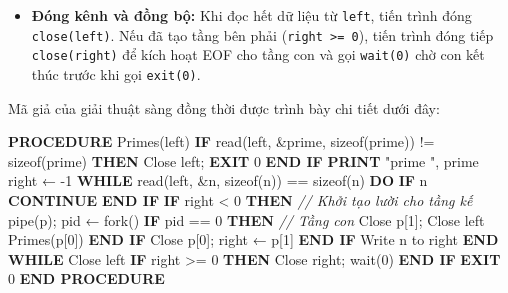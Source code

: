\documentclass[12pt,a4paper]{article}
\newenvironment{algorithmblock}[1]{%
  \begin{tcolorbox}[
    enhanced,
    breakable,
    colback=white,
    colframe=primary!55,
    colbacktitle=primary,
    coltitle=white,
    boxrule=0.7pt,
    arc=2pt,
    left=10pt,right=10pt,top=7pt,bottom=8pt,
    title={#1},
    fonttitle=\small
  ]
}{%
  \end{tcolorbox}
}
\begin{document}
\begin{enumerate}
\begin{itemize}
\begin{itemize}
\begin{itemize}
        \item Tiến trình cha đóng đầu đọc \texttt{close(p[0])} và lưu \texttt{right = p[1]}.
      \end{itemize}
      Sau đó, tiến trình ghi \texttt{n} sang tầng kế tiếp: \texttt{write(right, \&n, sizeof(n))}.
    \end{itemize}
    \item \textbf{Đóng kênh và đồng bộ:} Khi đọc hết dữ liệu từ \texttt{left}, tiến trình đóng \texttt{close(left)}. Nếu đã tạo tầng bên phải (\texttt{right >= 0}), tiến trình đóng tiếp \texttt{close(right)} để kích hoạt EOF cho tầng con và gọi \texttt{wait(0)} chờ con kết thúc trước khi gọi \texttt{exit(0)}.
  \end{itemize}
\end{enumerate}

Mã giả của giải thuật sàng đồng thời được trình bày chi tiết dưới đây:

\begin{algorithmblock}{\texttt{primes}}
\begin{algorithmcode}
\textbf{PROCEDURE} Primes(left)
    \textbf{IF} read(left, &prime, sizeof(prime)) != sizeof(prime) \textbf{THEN}
        Close left; \textbf{EXIT} 0
    \textbf{END IF}
    \textbf{PRINT} "prime ", prime
    right ← -1
    \textbf{WHILE} read(left, &n, sizeof(n)) == sizeof(n) \textbf{DO}
        \textbf{IF} n %
            \textbf{CONTINUE}
        \textbf{END IF}
        \textbf{IF} right < 0 \textbf{THEN} \textit{// Khởi tạo lười cho tầng kế}
            pipe(p); pid ← fork()
            \textbf{IF} pid == 0 \textbf{THEN} \textit{// Tầng con}
                Close p[1]; Close left
                Primes(p[0])
            \textbf{END IF}
            Close p[0]; right ← p[1]
        \textbf{END IF}
        Write n to right
    \textbf{END WHILE}
    Close left
    \textbf{IF} right >= 0 \textbf{THEN}
        Close right; wait(0)
    \textbf{END IF}
    \textbf{EXIT} 0
\textbf{END PROCEDURE}
\end{algorithmcode}
\end{algorithmblock}
\end{document}
